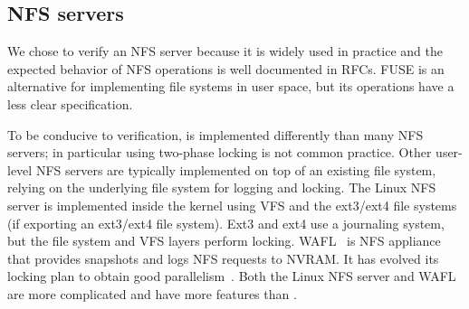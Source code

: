 

\subsection{NFS servers}

We chose to verify an NFS server because it is widely used in practice
and the expected behavior of NFS operations is well documented in
RFCs.  FUSE is an alternative for implementing file systems in user
space, but its operations have a less clear specification.

To be conducive to verification, \sys is implemented differently than
many NFS servers; in particular using two-phase locking is not common
practice.  Other user-level NFS servers are typically implemented on
top of an existing file system, relying on the underlying file system
for logging and locking. The Linux NFS server is implemented inside
the kernel using VFS and the ext3/ext4 file systems (if exporting an
ext3/ext4 file system).  Ext3 and ext4 use a journaling system, but
the file system and VFS layers perform locking.  WAFL~\cite{wafl:hitz}
is NFS appliance that provides snapshots and logs NFS requests to
NVRAM.  It has evolved its locking plan to obtain good
parallelism~\cite{curtis:wafl}.  Both the Linux NFS server and WAFL
are more complicated and have more features than \sys.

